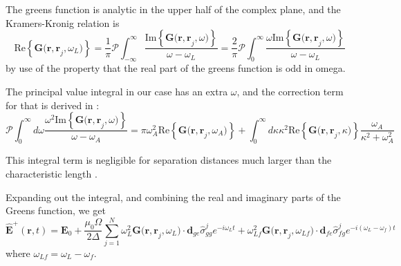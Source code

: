 \documentclass[a4paper, 11pt]{article}
\numberwithin{equation}{section}
\begin{document}
The greens function is analytic in the upper half of the complex plane, and the
Kramers-Kronig relation is
\begin{equation}
  \text{Re}\left\{ \mathbf{G(r, r}_j, \omega_L) \right\} = \frac{1}{\pi}\mathcal{P}
  \int_{-\infty}^\infty \frac{\text{Im}\left\{\mathbf{G(r, r}_j,
  \omega)\right\}}{\omega - \omega_L}
 = \frac{2}{\pi}\mathcal{P}
  \int_0^\infty \frac{\omega \text{Im}\left\{\mathbf{G(r, r}_j,
  \omega)\right\}}{\omega - \omega_L}
\end{equation}
by use of the property that the real part of the greens function is odd in omega.

The principal value integral in our case has an extra $\omega$, and the correction
term for that is derived in \cite{Dzsotjan_2011}:
\begin{equation}
  \mathcal{P}\int_0^\infty d\omega \frac{\omega^2 \text{Im}\left\{\mathbf{G(r, r}_j,
  \omega)\right\}}{\omega-\omega_A} = \pi\omega_A^2 \text{Re}\left\{\mathbf{G(r, r}_j,
  \omega_A)\right\} + \int_0^\infty d\kappa \kappa^2 \text{Re}\left\{\mathbf{G(r, r}_j,
  \kappa)\right\} \frac{\omega_A}{\kappa^2+\omega_A^2}
\end{equation}

This integral term is negligible for separation distances much larger than the
characteristic length \cite{Dzsotjan_2011}.

Expanding out the integral, and combining the real and imaginary parts of the Greens
function, we get
\begin{equation}\boxed{
  \hat{\mathbf{E}}^+(\mathbf{r}, t) = \mathbf{E}_0 + \frac{\mu_0\Omega}{2\Delta}
  \sum_{j=1}^N \omega_L^2\mathbf{G(r, r}_j, \omega_L) \cdot
  \mathbf{d}_{ge} \hat{\sigma}_{gg}^je^{-i\omega_Lt} + \omega_{Lf}^2
  \mathbf{G(r, r}_j, \omega_{Lf}) \cdot \mathbf{d}_{fe}
\hat{\sigma}_{fg}^je^{-i(\omega_L-\omega_f)t}
}\end{equation}
where $\omega_{Lf} = \omega_L-\omega_f$.

\color{black}
\newpage
{}

\end{document}
